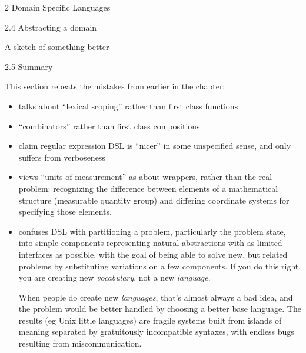 \documentclass[12pt]{PalisadesLakesBook}
\begin{document}
\begin{plSection}{2 Domain Specific Languages}
\begin{plSection}{2.4 Abstracting a domain}
\begin{plSection}{A sketch of something better}
\end{plSection}%
\end{plSection}%
\begin{plSection}{2.5 Summary}

This section repeats the mistakes from earlier in the chapter:
\begin{itemize}
  \item talks about ``lexical scoping'' rather than 
  first class functions
  \item ``combinators'' rather than first class compositions
  \item claim regular expression DSL is ``nicer'' in some 
  unspecified sense, and only suffers from verboseness
  \item views ``units of measurement'' as about wrappers,
  rather than the real problem: recognizing the difference
  between elements of a mathematical structure 
  (measurable quantity group) and differing coordinate systems
  for specifying those elements.
  \item confuses DSL with partitioning a problem,
  particularly the problem state, into simple components
  representing natural abstractions with as limited interfaces
  as possible, with the goal of being able to solve new, 
  but related problems by substituting variations on a few 
  components.
  If you do this right, you are creating new \emph{vocabulary},
  not a new \emph{language}.
  
  When people do create new \emph{languages},
  that's almost always a bad idea,
  and the problem would be better handled by choosing a better
  base language.
  The results (eg Unix little languages) are fragile systems built
  from islands of meaning separated 
  by gratuitously incompatible syntaxes,
  with endless bugs resulting from miscommunication.
\end{itemize}
\end{plSection}%
\end{plSection}%
\end{document}
